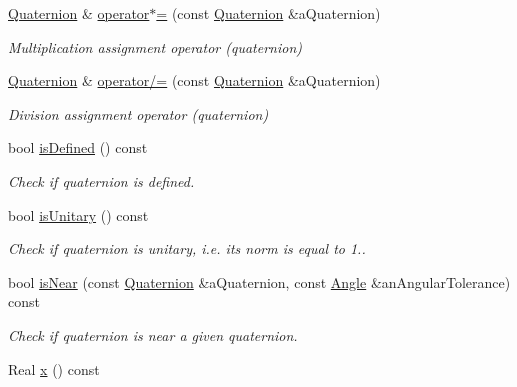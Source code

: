 \begin{DoxyCompactItemize}
\hyperlink{classostk_1_1math_1_1geom_1_1d3_1_1trf_1_1rot_1_1_quaternion}{Quaternion} \& \hyperlink{classostk_1_1math_1_1geom_1_1d3_1_1trf_1_1rot_1_1_quaternion_a71db9c92c8d780a7ffed6926014dd43b}{operator$\ast$=} (const \hyperlink{classostk_1_1math_1_1geom_1_1d3_1_1trf_1_1rot_1_1_quaternion}{Quaternion} \&a\+Quaternion)
\begin{DoxyCompactList}\small\item\em Multiplication assignment operator (quaternion) \end{DoxyCompactList}\item 
\hyperlink{classostk_1_1math_1_1geom_1_1d3_1_1trf_1_1rot_1_1_quaternion}{Quaternion} \& \hyperlink{classostk_1_1math_1_1geom_1_1d3_1_1trf_1_1rot_1_1_quaternion_aee3bd39ff2bb79ed0817e1995329fe17}{operator/=} (const \hyperlink{classostk_1_1math_1_1geom_1_1d3_1_1trf_1_1rot_1_1_quaternion}{Quaternion} \&a\+Quaternion)
\begin{DoxyCompactList}\small\item\em Division assignment operator (quaternion) \end{DoxyCompactList}\item 
bool \hyperlink{classostk_1_1math_1_1geom_1_1d3_1_1trf_1_1rot_1_1_quaternion_a4d605d7242ef08aa841ab41df4e06a17}{is\+Defined} () const
\begin{DoxyCompactList}\small\item\em Check if quaternion is defined. \end{DoxyCompactList}\item 
bool \hyperlink{classostk_1_1math_1_1geom_1_1d3_1_1trf_1_1rot_1_1_quaternion_a4e1cafc25046da2cf605694b96066770}{is\+Unitary} () const
\begin{DoxyCompactList}\small\item\em Check if quaternion is unitary, i.\+e. its norm is equal to 1.. \end{DoxyCompactList}\item 
bool \hyperlink{classostk_1_1math_1_1geom_1_1d3_1_1trf_1_1rot_1_1_quaternion_abb1535e6e8cfbe38dd7ce4e153374962}{is\+Near} (const \hyperlink{classostk_1_1math_1_1geom_1_1d3_1_1trf_1_1rot_1_1_quaternion}{Quaternion} \&a\+Quaternion, const \hyperlink{classostk_1_1math_1_1geom_1_1_angle}{Angle} \&an\+Angular\+Tolerance) const
\begin{DoxyCompactList}\small\item\em Check if quaternion is near a given quaternion. \end{DoxyCompactList}\item 
Real \hyperlink{classostk_1_1math_1_1geom_1_1d3_1_1trf_1_1rot_1_1_quaternion_a894bf65f86e57876fb498dd1fffc458d}{x} () const

\end{DoxyCompactItemize}
